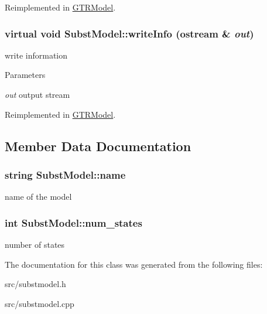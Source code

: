 Reimplemented in \hyperlink{classGTRModel_a01c47ec7ac4b856e60aa3e4339e0044a}{GTRModel}.\hypertarget{classSubstModel_ac81144591a9eb6b6d9abc9e873a20af6}{
\subsubsection[{writeInfo}]{\setlength{\rightskip}{0pt plus 5cm}virtual void SubstModel::writeInfo (ostream \& {\em out})}}
\label{classSubstModel_ac81144591a9eb6b6d9abc9e873a20af6}
write information 
\begin{DoxyParams}{Parameters}
\item[{\em out}]output stream \end{DoxyParams}


Reimplemented in \hyperlink{classGTRModel_a233f9b473e4e3c549d801ff8a084e35e}{GTRModel}.

\subsection{Member Data Documentation}
\hypertarget{classSubstModel_a28fd43ca59508025c8faa9365861a3d8}{
\subsubsection[{name}]{\setlength{\rightskip}{0pt plus 5cm}string {\bf SubstModel::name}}}
\label{classSubstModel_a28fd43ca59508025c8faa9365861a3d8}
name of the model \hypertarget{classSubstModel_abc3ccd407830f359e794ac3fd51a5559}{
\subsubsection[{num\_\-states}]{\setlength{\rightskip}{0pt plus 5cm}int {\bf SubstModel::num\_\-states}}}
\label{classSubstModel_abc3ccd407830f359e794ac3fd51a5559}
number of states 

The documentation for this class was generated from the following files:\begin{DoxyCompactItemize}
\item 
src/substmodel.h\item 
src/substmodel.cpp\end{DoxyCompactItemize}
